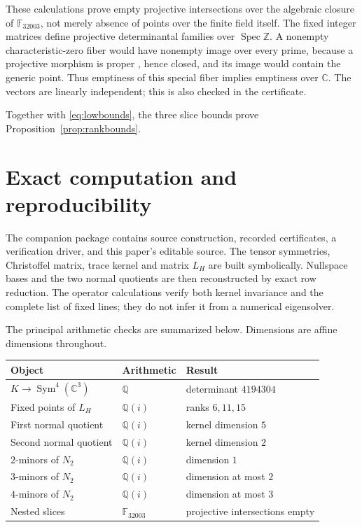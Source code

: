\documentclass[11pt]{amsart}
\theoremstyle{remark}
\newcommand{\C}{\mathbb C}
\newcommand{\Q}{\mathbb Q}
\newcommand{\Sym}{\operatorname{Sym}}
\begin{document}
These calculations prove empty projective intersections over the algebraic closure of $\mathbb F_{32003}$, not merely absence of points over the finite field itself. The fixed integer matrices define projective determinantal families over $\operatorname{Spec}\mathbb Z$. A nonempty characteristic-zero fiber would have nonempty image over every prime, because a projective morphism is proper \cite[Tag~01WC]{stacks}, hence closed, and its image would contain the generic point. Thus emptiness of this special fiber implies emptiness over $\C$. The vectors are linearly independent; this is also checked in the certificate.

Together with \eqref{eq:lowbounds}, the three slice bounds prove Proposition~\ref{prop:rankbounds}.

\section{Exact computation and reproducibility}\label{sec:computation}

The companion package contains source construction, recorded certificates, a verification driver, and this paper's editable source. The tensor symmetries, Christoffel matrix, trace kernel and matrix $L_H$ are built symbolically. Nullspace bases and the two normal quotients are then reconstructed by exact row reduction. The operator calculations verify both kernel invariance and the complete list of fixed lines; they do not infer it from a numerical eigensolver.

The principal arithmetic checks are summarized below. Dimensions are affine dimensions throughout.
\begin{center}
\small
\begin{tabular}{p{}p{}p{}}
\toprule
Object & Arithmetic & Result\\
\midrule
$K\to\Sym^4(\C^3)$ & $\Q$ & determinant $4194304$\\
Fixed points of $L_H$ & $\Q(i)$ & ranks $6,11,15$\\
First normal quotient & $\Q(i)$ & kernel dimension $5$\\
Second normal quotient & $\Q(i)$ & kernel dimension $2$\\
$2$-minors of $N_2$ & $\Q(i)$ & dimension $1$\\
$3$-minors of $N_2$ & $\Q(i)$ & dimension at most $2$\\
$4$-minors of $N_2$ & $\Q(i)$ & dimension at most $3$\\
Nested slices & $\mathbb F_{32003}$ & projective intersections empty\\
\bottomrule
\end{tabular}
\end{center}
\end{document}

